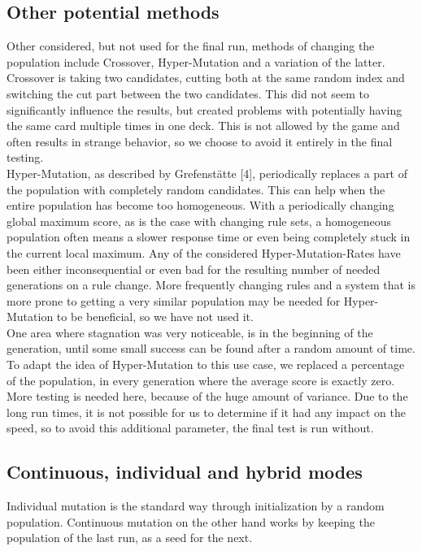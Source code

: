 \subsection{Other potential methods}
\label{sec:method:genalg:other_mutation}
Other considered, but not used for the final run, methods of changing the population include Crossover, Hyper-Mutation and a variation of the latter. \\
Crossover is taking two candidates, cutting both at the same random index and switching the cut part between the two candidates. This did not seem to significantly influence the results, but created problems with potentially having the same card multiple times in one deck. This is not allowed by the game and often results in strange behavior, so we choose to avoid it entirely in the final testing. \\ 
Hyper-Mutation, as described by Grefenstätte [4], periodically replaces a part of the population with completely random candidates. This can help when the entire population has become too homogeneous. With a periodically changing global maximum score, as is the case with changing rule sets, a homogeneous population often means a slower response time or even being completely stuck in the current local maximum. Any of the considered Hyper-Mutation-Rates have been either inconsequential or even bad for the resulting number of needed generations on a rule change. More frequently changing rules and a system that is more prone to getting a very similar population may be needed for Hyper-Mutation to be beneficial, so we have not used it.\\
One area where stagnation was very noticeable, is in the beginning of the generation, until some small success can be found after a random amount of time. To adapt the idea of Hyper-Mutation to this use case, we replaced a percentage of the population, in every generation where the average score is exactly zero. More testing is needed here, because of the huge amount of variance. Due to the long run times, it is not possible for us to determine if it had any impact on the speed, so to avoid this additional parameter, the final test is run without.\\

\subsection{Continuous, individual and hybrid modes}
\label{sec:method:testing:continuous_individual_hybrid}
Individual mutation is the standard way through initialization by a random population. Continuous mutation on the other hand works by keeping the population of the last run, as a seed for the next.

